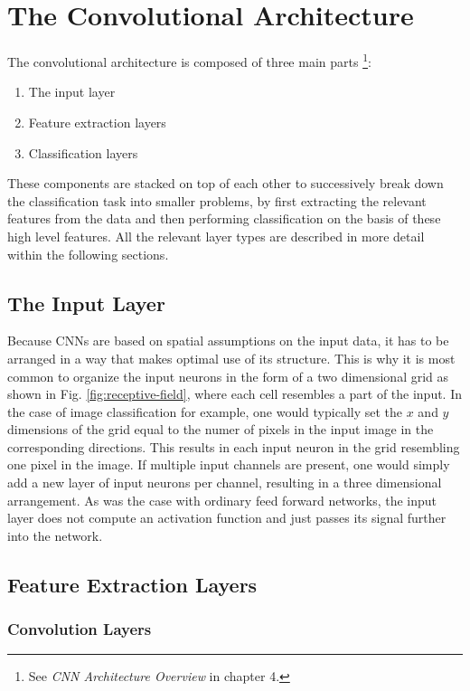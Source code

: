 \newpage
\section{The Convolutional Architecture}

The convolutional architecture is composed of three main parts
\cite{Patterson}\footnote{See \textit{CNN Architecture Overview} in
  chapter 4.}:
\begin{enumerate}
  \item The input layer
  \item Feature extraction layers
  \item Classification layers
\end{enumerate}
These components are stacked on top of each other to successively
break down the classification task into smaller problems, by first
extracting the relevant features from the data and then performing
classification on the basis of these high level features.
All the relevant layer types are described in
more detail within the following sections.

\subsection{The Input Layer}

Because CNNs are based on spatial assumptions on the input data, it
has to be arranged in a way that makes optimal use of its
structure. This is why it is most common to organize the input neurons
in the form of a two dimensional grid as shown in
Fig. \ref{fig:receptive-field}, where each cell resembles a
part of the input. In the case of image classification for example,
one would typically set the \(x\) and \(y\) dimensions of the grid
equal to the numer of pixels in the input image in the corresponding
directions. This results in each input neuron in the grid resembling
one pixel in the image. If multiple input channels are present, one
would simply add a new layer of input neurons per channel, resulting
in a three dimensional arrangement. As was the case with ordinary feed
forward networks, the input layer does not compute an activation
function and just passes its signal further into the network.

\subsection{Feature Extraction Layers}

\subsubsection{Convolution Layers}

